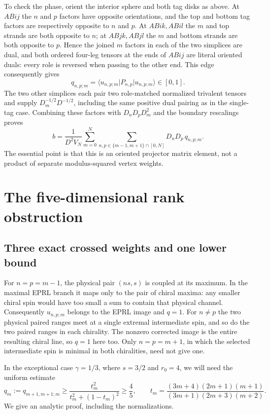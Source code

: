 \documentclass[11pt]{article}
\theoremstyle{remark}
\newcommand{\pket}[1]{\lvert #1\rangle}
\newcommand{\pbra}[1]{\langle #1\rvert}
\begin{document}
To check the phase, orient the interior sphere and both tag disks as above. At \(ABij\) the \(n\) and \(p\) factors have opposite orientations, and the top and bottom tag factors are respectively opposite to \(n\) and \(p\). At \(ABik,ABil\) the \(m\) and top strands are both opposite to \(n\); at \(ABjk,ABjl\) the \(m\) and bottom strands are both opposite to \(p\). Hence the joined \(m\) factors in each of the two simplices are dual, and both ordered four-leg tensors at the ends of \(ABij\) are literal oriented duals: every role is reversed when passing to the other end. This edge consequently gives
\[
 q_{n,p;m}=\pbra{u_{n,p;m}}P_{n,p}\pket{u_{n,p;m}}\in[0,1].
\]
The two other simplices each pair two role-matched normalized trivalent tensors and supply \(D_m^{-1/2}D^{-1/2}\), including the same positive dual pairing as in the single-tag case. Combining these factors with \(D_nD_pD_m^2\) and the boundary rescalings proves
\begin{equation}\label{eq:b}
 b=\frac{1}{D^2V_N}\sum_{m=0}^N
 \sum_{n,p\in\{m-1,m+1\}\cap[0,N]}D_nD_p\,q_{n,p;m}.
\end{equation}
The essential point is that this is an oriented projector matrix element, not a product of separate modulus-squared vertex weights.

\section{The five-dimensional rank obstruction}\label{sec:rank}

\subsection{Three exact crossed weights and one lower bound}

For \(n=p=m-1\), the physical pair \((ns,s)\) is coupled at its maximum. In the maximal EPRL branch it maps only to the pair of chiral maxima: any smaller chiral spin would have too small a sum to contain that physical channel. Consequently \(u_{n,p;m}\) belongs to the EPRL image and \(q=1\). For \(n\ne p\) the two physical paired ranges meet at a single extremal intermediate spin, and so do the two paired ranges in each chirality. The nonzero corrected image is the entire resulting chiral line, so \(q=1\) here too. Only \(n=p=m+1\), in which the selected intermediate spin is minimal in both chiralities, need not give one.

In the exceptional case \(\gamma=1/3\), where \(s=3/2\) and \(r_0=4\), we will need the uniform estimate
\begin{equation}\label{eq:qbound}
 q_m:=q_{m+1,m+1;m}\geq
 \frac{t_m^2}{t_m^2+(1-t_m)^2}\geq\frac45,\qquad
 t_m=\frac{(3m+4)(2m+1)(m+1)}{(3m+1)(2m+3)(m+2)} .
\end{equation}
We give an analytic proof, including the normalizations.
\end{document}
